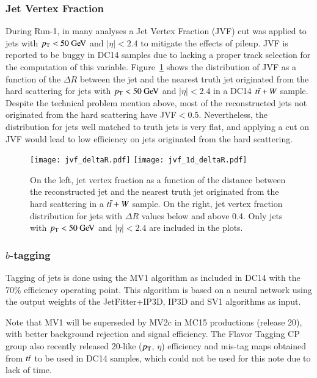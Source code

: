 \subsubsection{Jet Vertex Fraction}
During Run-1, in many analyses a Jet Vertex Fraction ({\sc JVF}) cut was applied  to jets with $\pT < 50 \GeV$ and $| \eta | < 2.4$ to mitigate the effects of pileup. JVF is reported to be buggy in DC14 samples due to lacking a proper track selection for the computation of this variable. Figure~\ref{fig:jvf_deltaR} shows the distribution of JVF as a function of the $\Delta R$ between the jet and the nearest truth jet originated from the hard scattering for jets with $\pT < 50 \GeV$ and $| \eta | < 2.4$ in a DC14 $t\bar{t} +W$ sample. 
Despite the technical problem mention above, most of the reconstructed jets not originated from the hard scattering have JVF$<$0.5. 
Nevertheless, the distribution for jets well matched to truth jets is very flat, and applying a cut on JVF would lead to 
low efficiency on jets originated from the hard scattering.


\begin{figure}[htb!!]
\begin{center}
\texttt{[image: jvf\_deltaR.pdf]}
\texttt{[image: jvf\_1d\_deltaR.pdf]}
\end{center}
\vspace{-0.2cm}
\caption{On the left, jet vertex fraction as a function of the distance between the reconstructed jet and the nearest truth jet originated from the hard scattering in a $t\bar{t}+W$ sample. On the right, jet vertex fraction distribution for jets with $\Delta R$ values below and above 0.4. Only jets with $\pT < 50 \GeV$ and $| \eta | < 2.4$ are included in the plots.}
\label{fig:jvf_deltaR}
\end{figure}

\subsubsection{$b$-tagging}

Tagging of jets is done using the MV1 algorithm as included in DC14 with the 70\% efficiency 
operating point. This algorithm is based on a neural network using 
the output weights of the JetFitter+IP3D, IP3D and SV1 algorithms as input.

Note that MV1 will be superseded by MV2c in MC15 productions (release 20), with better background rejection and signal efficiency. 
The Flavor Tagging CP group also recently released 20-like ($p_{\mathrm{T}}$, $\eta$) efficiency and mis-tag maps obtained from $t\bar{t}$ to be used in DC14 samples, which could not be used for this note due to lack of time.


